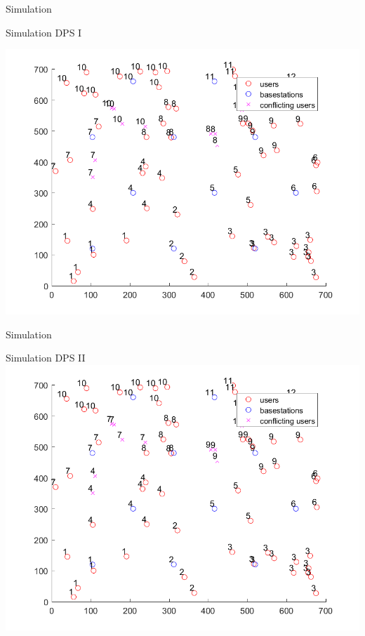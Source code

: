 \documentclass[xcolor={cmyk}]{beamer}
\begin{document}
 \begin{frame}{Simulation}
 \begin{block}{Simulation DPS I}
 
 \includegraphics[width=\linewidth,height=\textheight,keepaspectratio]{MapPlotDPS1.png}
 \end{block}
 \end{frame}
 
 \begin{frame}{Simulation}
 \begin{block}{Simulation DPS II}
 \includegraphics[width=\linewidth,height=\textheight,keepaspectratio]{MapPlotDPS2.png}
 \end{block}
 \end{frame}
 
\end{document}
